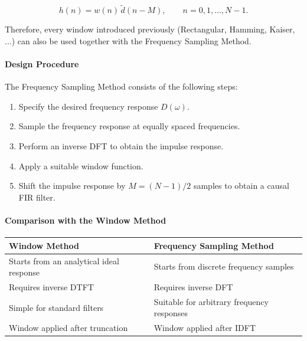 \[
\boxed{
h(n)
=
w(n)\,
\tilde d(n-M),
\qquad
n=0,1,\ldots,N-1.
}
\]

Therefore, every window introduced previously (Rectangular, Hamming,
Kaiser, ...) can also be used together with the Frequency Sampling
Method.

\paragraph{Design Procedure}

The Frequency Sampling Method consists of the following steps:

\begin{enumerate}
\item Specify the desired frequency response
      $D(\omega)$.

\item Sample the frequency response at
      equally spaced frequencies.

\item Perform an inverse DFT to obtain
      the impulse response.

\item Apply a suitable window function.

\item Shift the impulse response by
      $M=(N-1)/2$
      samples to obtain a causal FIR filter.
\end{enumerate}

\paragraph{Comparison with the Window Method}

\begin{center}
\renewcommand{\arraystretch}{1.25}
\begin{tabular}{|p{6cm}|p{6cm}|}
\hline
\textbf{Window Method}
&
\textbf{Frequency Sampling Method}
\\
\hline

Starts from an analytical ideal response
&
Starts from discrete frequency samples
\\
\hline

Requires inverse DTFT
&
Requires inverse DFT
\\
\hline

Simple for standard filters
&
Suitable for arbitrary frequency responses
\\
\hline

Window applied after truncation
&
Window applied after IDFT
\\
\hline

\end{tabular}
\end{center}

